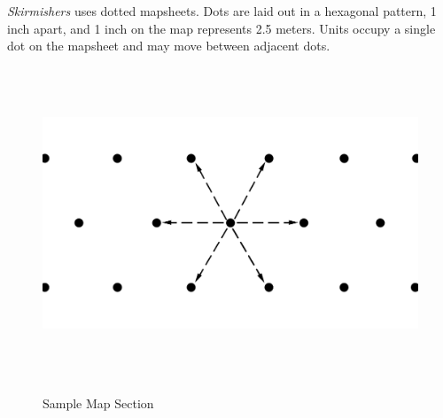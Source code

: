 \emph{Skirmishers} uses dotted mapsheets.
Dots are laid out in a hexagonal pattern, 1 inch apart, and 1 inch on the map represents 2.5 meters.
Units occupy a single dot on the mapsheet and may move between adjacent dots.

\begin{figure}[!h]
  \centering
  \includegraphics[alt='Sample dotted mapsheet', width=6.5in, height=3.66in]{img/Map.png}
  \caption*{Sample Map Section}
\end{figure}
